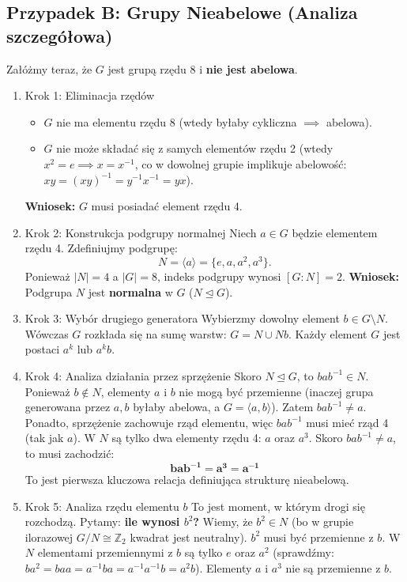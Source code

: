 \subsection{Przypadek B: Grupy Nieabelowe (Analiza szczegółowa)}
Załóżmy teraz, że $G$ jest grupą rzędu 8 i \textbf{nie jest abelowa}.
\begin{enumerate}[label=\Roman*)]

\item{Krok 1: Eliminacja rzędów}
    \begin{itemize}
        \item $G$ nie ma elementu rzędu 8 (wtedy byłaby cykliczna $\implies$ abelowa).
        \item $G$ nie może składać się z samych elementów rzędu 2 (wtedy $x^2=e \implies x=x^{-1}$, co w dowolnej grupie implikuje abelowość: $xy = (xy)^{-1} = y^{-1}x^{-1} = yx$).
    \end{itemize}
    \textbf{Wniosek:} $G$ musi posiadać element rzędu 4.
 

\item{Krok 2: Konstrukcja podgrupy normalnej}
    Niech $a \in G$ będzie elementem rzędu 4. Zdefiniujmy podgrupę:
    \[ N = \langle a \rangle = \{e, a, a^2, a^3\}. \]
    Ponieważ $|N|=4$ a $|G|=8$, indeks podgrupy wynosi $[G:N]=2$.
    \textbf{Wniosek:} Podgrupa $N$ jest \textbf{normalna} w $G$ ($N \unlhd G$).
 

\item{Krok 3: Wybór drugiego generatora}
    Wybierzmy dowolny element $b \in G \setminus N$.
    Wówczas $G$ rozkłada się na sumę warstw: $G = N \cup Nb$.
    Każdy element $G$ jest postaci $a^k$ lub $a^k b$.
 

\item{Krok 4: Analiza działania przez sprzężenie}
    Skoro $N \unlhd G$, to $bab^{-1} \in N$. Ponieważ $b \notin N$, elementy $a$ i $b$ nie mogą być przemienne (inaczej grupa generowana przez $a, b$ byłaby abelowa, a $G = \langle a, b \rangle$).
    Zatem $bab^{-1} \neq a$.
    Ponadto, sprzężenie zachowuje rząd elementu, więc $bab^{-1}$ musi mieć rząd 4 (tak jak $a$). W $N$ są tylko dwa elementy rzędu 4: $a$ oraz $a^3$.
    Skoro $bab^{-1} \neq a$, to musi zachodzić:
    \[ \bm{bab^{-1} = a^3 = a^{-1}} \]
    To jest pierwsza kluczowa relacja definiująca strukturę nieabelową.
 

\item{Krok 5: Analiza rzędu elementu $b$}
    To jest moment, w którym drogi się rozchodzą. Pytamy: \textbf{ile wynosi $b^2$?}
    Wiemy, że $b^2 \in N$ (bo w grupie ilorazowej $G/N \cong \mathbb{Z}_2$ kwadrat jest neutralny).
    $b^2$ musi być przemienne z $b$. W $N$ elementami przemiennymi z $b$ są tylko $e$ oraz $a^2$ (sprawdźmy: $b a^2 = b a a = a^{-1} b a = a^{-1} a^{-1} b = a^2 b$). Elementy $a$ i $a^3$ nie są przemienne z $b$.
    

\end{enumerate}
